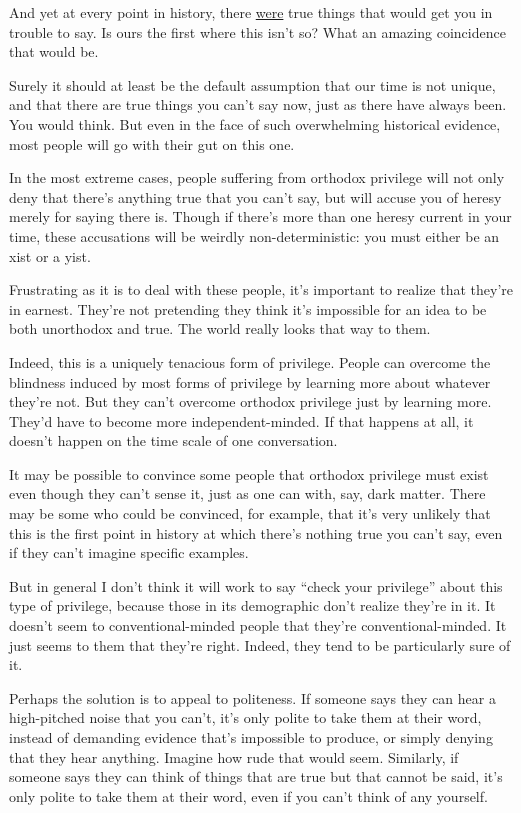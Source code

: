 \documentclass[12pt]{book}
\begin{document}
And yet at every point in history, there \href{say.html}{were} true
things that would get you in trouble to say. Is ours the first where
this isn't so? What an amazing coincidence that would be.

Surely it should at least be the default assumption that our time is not
unique, and that there are true things you can't say now, just as there
have always been. You would think. But even in the face of such
overwhelming historical evidence, most people will go with their gut on
this one.

In the most extreme cases, people suffering from orthodox privilege will
not only deny that there's anything true that you can't say, but will
accuse you of heresy merely for saying there is. Though if there's more
than one heresy current in your time, these accusations will be weirdly
non-deterministic: you must either be an xist or a yist.

Frustrating as it is to deal with these people, it's important to
realize that they're in earnest. They're not pretending they think it's
impossible for an idea to be both unorthodox and true. The world really
looks that way to them.

Indeed, this is a uniquely tenacious form of privilege. People can
overcome the blindness induced by most forms of privilege by learning
more about whatever they're not. But they can't overcome orthodox
privilege just by learning more. They'd have to become more
independent-minded. If that happens at all, it doesn't happen on the
time scale of one conversation.

It may be possible to convince some people that orthodox privilege must
exist even though they can't sense it, just as one can with, say, dark
matter. There may be some who could be convinced, for example, that it's
very unlikely that this is the first point in history at which there's
nothing true you can't say, even if they can't imagine specific
examples.

But in general I don't think it will work to say ``check your
privilege'' about this type of privilege, because those in its
demographic don't realize they're in it. It doesn't seem to
conventional-minded people that they're conventional-minded. It just
seems to them that they're right. Indeed, they tend to be particularly
sure of it.

Perhaps the solution is to appeal to politeness. If someone says they
can hear a high-pitched noise that you can't, it's only polite to take
them at their word, instead of demanding evidence that's impossible to
produce, or simply denying that they hear anything. Imagine how rude
that would seem. Similarly, if someone says they can think of things
that are true but that cannot be said, it's only polite to take them at
their word, even if you can't think of any yourself.
\end{document}
